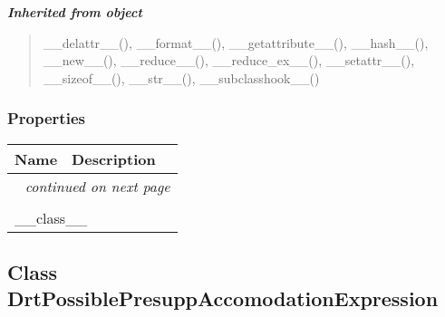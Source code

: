 \large{\textbf{\textit{Inherited from object}}}

\begin{quote}
\_\_delattr\_\_(), \_\_format\_\_(), \_\_getattribute\_\_(), \_\_hash\_\_(), \_\_new\_\_(), \_\_reduce\_\_(), \_\_reduce\_ex\_\_(), \_\_setattr\_\_(), \_\_sizeof\_\_(), \_\_str\_\_(), \_\_subclasshook\_\_()
\end{quote}


  \subsubsection{Properties}

    \vspace{-1cm}
\hspace{\varindent}\begin{longtable}{|p{\varnamewidth}|p{\vardescrwidth}|l}
\cline{1-2}
\cline{1-2} \centering \textbf{Name} & \centering \textbf{Description}& \\
\cline{1-2}
\endhead\cline{1-2}\multicolumn{3}{r}{\small\textit{continued on next page}}\\\endfoot\cline{1-2}
\endlastfoot\multicolumn{2}{|l|}{\textit{Inherited from object}}\\
\multicolumn{2}{|p{\varwidth}|}{\raggedright \_\_class\_\_}\\
\cline{1-2}
\end{longtable}



\subsection{Class DrtPossiblePresuppAccomodationExpression}

